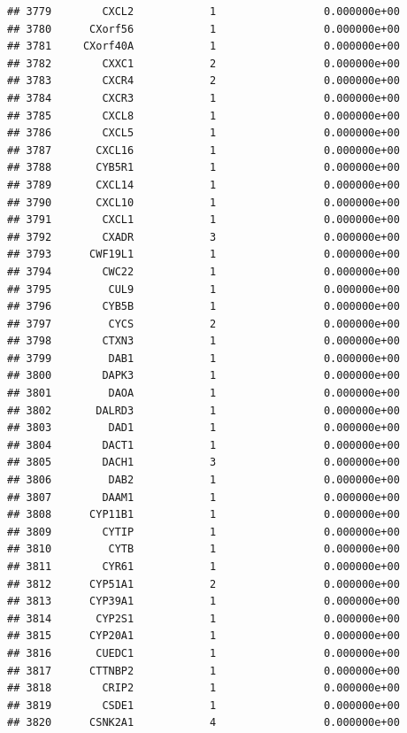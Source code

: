 \documentclass[
]{article}
\begin{document}
\begin{verbatim}
## 3779        CXCL2            1                 0.000000e+00
## 3780      CXorf56            1                 0.000000e+00
## 3781     CXorf40A            1                 0.000000e+00
## 3782        CXXC1            2                 0.000000e+00
## 3783        CXCR4            2                 0.000000e+00
## 3784        CXCR3            1                 0.000000e+00
## 3785        CXCL8            1                 0.000000e+00
## 3786        CXCL5            1                 0.000000e+00
## 3787       CXCL16            1                 0.000000e+00
## 3788       CYB5R1            1                 0.000000e+00
## 3789       CXCL14            1                 0.000000e+00
## 3790       CXCL10            1                 0.000000e+00
## 3791        CXCL1            1                 0.000000e+00
## 3792        CXADR            3                 0.000000e+00
## 3793      CWF19L1            1                 0.000000e+00
## 3794        CWC22            1                 0.000000e+00
## 3795         CUL9            1                 0.000000e+00
## 3796        CYB5B            1                 0.000000e+00
## 3797         CYCS            2                 0.000000e+00
## 3798        CTXN3            1                 0.000000e+00
## 3799         DAB1            1                 0.000000e+00
## 3800        DAPK3            1                 0.000000e+00
## 3801         DAOA            1                 0.000000e+00
## 3802       DALRD3            1                 0.000000e+00
## 3803         DAD1            1                 0.000000e+00
## 3804        DACT1            1                 0.000000e+00
## 3805        DACH1            3                 0.000000e+00
## 3806         DAB2            1                 0.000000e+00
## 3807        DAAM1            1                 0.000000e+00
## 3808      CYP11B1            1                 0.000000e+00
## 3809        CYTIP            1                 0.000000e+00
## 3810         CYTB            1                 0.000000e+00
## 3811        CYR61            1                 0.000000e+00
## 3812      CYP51A1            2                 0.000000e+00
## 3813      CYP39A1            1                 0.000000e+00
## 3814       CYP2S1            1                 0.000000e+00
## 3815      CYP20A1            1                 0.000000e+00
## 3816       CUEDC1            1                 0.000000e+00
## 3817      CTTNBP2            1                 0.000000e+00
## 3818        CRIP2            1                 0.000000e+00
## 3819        CSDE1            1                 0.000000e+00
## 3820      CSNK2A1            4                 0.000000e+00

\end{verbatim}
\end{document}
